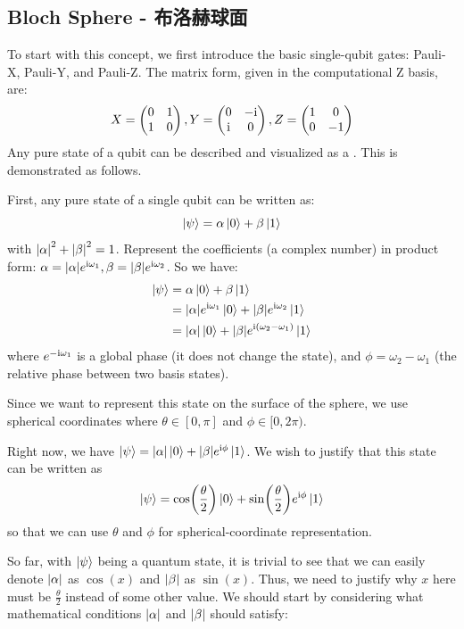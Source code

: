 \subsection{Bloch Sphere - 布洛赫球面}
To start with this concept, we first introduce the basic single-qubit gates: Pauli-X, Pauli-Y, and Pauli-Z. The matrix form, given in the computational Z basis, are:
$$X = \begin{pmatrix}
    0 & 1 \\
    1 & 0
\end{pmatrix}, Y = \begin{pmatrix}
    0 & -\mathrm{i} \\
    \mathrm{i} & 0
\end{pmatrix}, Z = \begin{pmatrix}
    1 & 0 \\
    0 & -1
\end{pmatrix}$$
Any pure state of a qubit can be described and visualized as a . This is demonstrated as follows. \par
First, any pure state of a single qubit can be written as:
$$\ket{\psi} = \alpha \ket{0} + \beta \ket{1}$$
with $\abs{\alpha}^2 + \abs{\beta}^2 = 1$. Represent the coefficients (a complex number) in product form: $\alpha = \abs{\alpha}e^{\mathrm{i} \omega_1}, \beta = \abs{\beta}e^{\mathrm{i} \omega_2}$. So we have:
\begin{align*}
    \ket{\psi} &= \alpha \ket{0} + \beta \ket{1} \\
    &= |\alpha|e^{\mathrm{i} \omega_1}\ket{0} + \abs{\beta}e^{\mathrm{i} \omega_2}\ket{1} \\
    &= \abs{\alpha}\ket{0} + \abs{\beta}e^{\mathrm{i} (\omega_2 - \omega_1)}\ket{1}
\end{align*}
where $e^{-\mathrm{i} \omega_1}$ is a global phase (it does not change the state), and $\phi = \omega_2 - \omega_1$ (the relative phase between two basis states). \par
Since we want to represent this state on the surface of the sphere, we use spherical coordinates where $\theta \in [0, \pi]$ and $\phi \in [0, 2\pi)$. \par
Right now, we have $\ket{\psi} = \abs{\alpha}\ket{0} + \abs{\beta}e^{\mathrm{i}\phi}\ket{1}$. We wish to justify that this state can be written as
$$\ket{\psi} = \cos(\frac{\theta}{2})\ket{0} + \sin(\frac{\theta}{2})e^{\mathrm{i} \phi}\ket{1}$$
so that we can use $\theta$ and $\phi$ for spherical-coordinate representation. \par
So far, with $\ket{\psi}$ being a quantum state, it is trivial to see that we can easily denote $\abs{\alpha}$ as $\cos(x)$ and $\abs{\beta}$ as $\sin(x)$. Thus, we need to justify why $x$ here must be $\frac{\theta}{2}$ instead of some other value. We should start by considering what mathematical conditions $\abs{\alpha}$ and $\abs{\beta}$ should satisfy:
